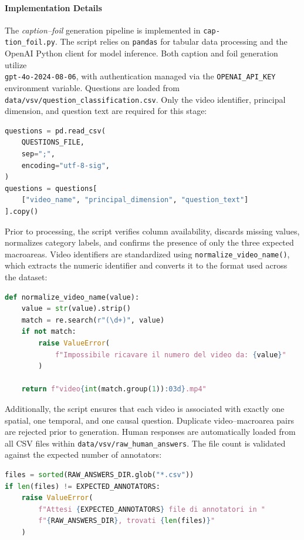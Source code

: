 \paragraph{Implementation Details}
The \textit{caption--foil} generation pipeline is implemented in \texttt{cap-\\tion\_foil.py}. The script relies on \texttt{pandas} for tabular data processing and the OpenAI Python client for model inference. Both caption and foil generation utilize \\\texttt{gpt-4o-2024-08-06}, with authentication managed via the \texttt{OPENAI\_API\_KEY} environment variable. 
Questions are loaded from \texttt{data/vsv/question\_classification.csv}. Only the video identifier, principal dimension, and question text are required for this stage:
\begin{lstlisting}[language=Python]
questions = pd.read_csv(
    QUESTIONS_FILE,
    sep=";",
    encoding="utf-8-sig",
)
questions = questions[
    ["video_name", "principal_dimension", "question_text"]
].copy()
\end{lstlisting}
Prior to processing, the script verifies column availability, discards missing values, normalizes category labels, and confirms the presence of only the three expected macroareas. Video identifiers are standardized using \texttt{normalize\_video\_name()}, which extracts the numeric identifier and converts it to the format used across the dataset:
\begin{lstlisting}[language=Python]
def normalize_video_name(value):
    value = str(value).strip()
    match = re.search(r"(\d+)", value)
    if not match:
        raise ValueError(
            f"Impossibile ricavare il numero del video da: {value}"
        )

    return f"video{int(match.group(1)):03d}.mp4"
\end{lstlisting}
Additionally, the script ensures that each video is associated with exactly one spatial, one temporal, and one causal question. Duplicate video--macroarea pairs are rejected prior to generation.
Human responses are automatically loaded from all CSV files within \texttt{data/vsv/raw\_human\_answers}. The file count is validated against the expected number of annotators:
\begin{lstlisting}[language=Python]
files = sorted(RAW_ANSWERS_DIR.glob("*.csv"))
if len(files) != EXPECTED_ANNOTATORS:
    raise ValueError(
        f"Attesi {EXPECTED_ANNOTATORS} file di annotatori in "
        f"{RAW_ANSWERS_DIR}, trovati {len(files)}"
    )
\end{lstlisting}
